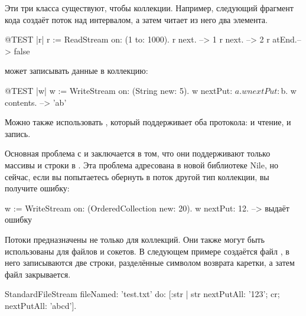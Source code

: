 \documentclass[a4paper,10pt,twoside]{book}
\begin{document}
Эти три класса существуют, чтобы  коллекции.
Например, следующий фрагмент кода создаёт поток над интервалом, а затем читает из него два элемента.
\begin{code}{@TEST |r|}
r := ReadStream on: (1 to: 1000).
r next.   --> 1
r next.   --> 2
r atEnd.--> false
\end{code}

 может записывать данные в коллекцию:
\begin{code}{@TEST |w|}
w := WriteStream on: (String new: 5).
w nextPut: $a.
w nextPut: $b.
w contents. -->  'ab'
\end{code}

Можно также использовать , который поддерживает оба протокола: и чтение, и запись.

Основная проблема с  и  заключается в том, что они поддерживают только массивы и строки в \pharo. Эта проблема адресована в новой библиотеке Nile, но сейчас, если вы попытаетесь обернуть в поток другой тип коллекции, вы получите ошибку:

\begin{code}{}
w := WriteStream on: (OrderedCollection new: 20).
w nextPut: 12. -->  выдаёт ошибку
\end{code}

Потоки предназначены не только для коллекций. Они также могут быть использованы для файлов и сокетов. В следующем примере создаётся файл , в него записываются две строки, разделённые символом возврата каретки, а затем файл закрывается.

\begin{code}{}
StandardFileStream
  fileNamed: 'test.txt'
  do: [:str | str
                nextPutAll: '123';
                cr;
                nextPutAll: 'abcd'].
\end{code}
\end{document}
